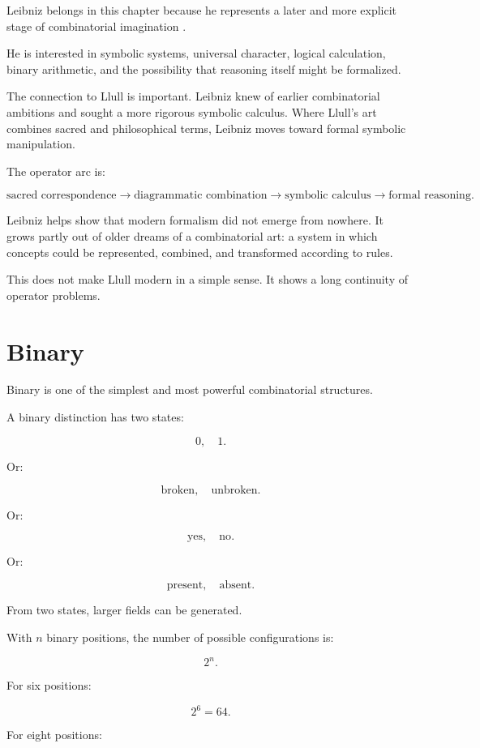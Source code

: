\documentclass[11pt]{book}
\begin{document}
Leibniz belongs in this chapter because he represents a later and more explicit stage of combinatorial imagination \cite{Leibniz1697Binary,Eco1995SearchPerfectLanguage,Yates1966ArtMemory}.

He is interested in symbolic systems, universal character, logical calculation, binary arithmetic, and the possibility that reasoning itself might be formalized.

The connection to Llull is important. Leibniz knew of earlier combinatorial ambitions and sought a more rigorous symbolic calculus. Where Llull's art combines sacred and philosophical terms, Leibniz moves toward formal symbolic manipulation.

The operator arc is:

\[
\text{sacred correspondence}
\rightarrow
\text{diagrammatic combination}
\rightarrow
\text{symbolic calculus}
\rightarrow
\text{formal reasoning}.
\]

Leibniz helps show that modern formalism did not emerge from nowhere. It grows partly out of older dreams of a combinatorial art: a system in which concepts could be represented, combined, and transformed according to rules.

This does not make Llull modern in a simple sense. It shows a long continuity of operator problems.

\section{Binary}

Binary is one of the simplest and most powerful combinatorial structures.

A binary distinction has two states:

\[
0,\quad 1.
\]

Or:

\[
\text{broken},\quad \text{unbroken}.
\]

Or:

\[
\text{yes},\quad \text{no}.
\]

Or:

\[
\text{present},\quad \text{absent}.
\]

From two states, larger fields can be generated.

With \(n\) binary positions, the number of possible configurations is:

\[
2^n.
\]

For six positions:

\[
2^6 = 64.
\]

For eight positions:
\end{document}

